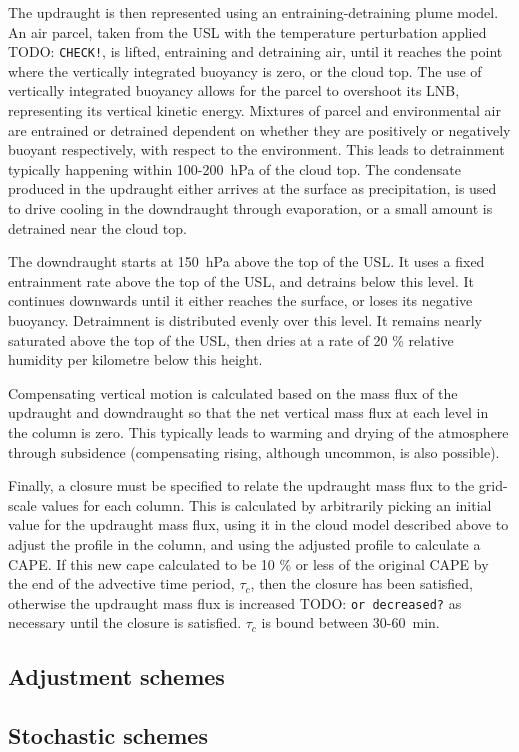 \documentclass[11pt,a4paper]{article}
\newcommand{\todo}{TODO: \texttt}
\begin{document}
The updraught is then represented using an entraining-detraining plume model. An air parcel, taken from the USL with the temperature perturbation applied \todo{CHECK!}, is lifted, entraining and detraining air, until it reaches the point where the vertically integrated buoyancy is zero, or the cloud top. The use of vertically integrated buoyancy allows for the parcel to overshoot its LNB, representing its vertical kinetic energy. Mixtures of parcel and environmental air are entrained or detrained dependent on whether they are positively or negatively buoyant respectively, with respect to the environment. This leads to detrainment typically happening within \SI{100}{}-\SI{200}{hPa} of the cloud top. The condensate produced in the updraught either arrives at the surface as precipitation, is used to drive cooling in the downdraught through evaporation, or a small amount is detrained near the cloud top.

The downdraught starts at \SI{150}{hPa} above the top of the USL. It uses a fixed entrainment rate above the top of the USL, and detrains below this level. It continues downwards until it either reaches the surface, or loses its negative buoyancy. Detraimnent is distributed evenly over this level. It remains nearly saturated above the top of the USL, then dries at a rate of 20 \% relative humidity per kilometre below this height.

Compensating vertical motion is calculated based on the mass flux of the updraught and downdraught so that the net vertical mass flux at each level in the column is zero. This typically leads to warming and drying of the atmosphere through subsidence (compensating rising, although uncommon, is also possible).

Finally, a closure must be specified to relate the updraught mass flux to the grid-scale values for each column. This is calculated by arbitrarily picking an initial value for the updraught mass flux, using it in the cloud model described above to adjust the profile in the column, and using the adjusted profile to calculate a CAPE. If this new cape calculated to be 10 \% or less of the original CAPE by the end of the advective time period, $\tau_c$, then the closure has been satisfied, otherwise the updraught mass flux is increased \todo{or decreased?} as necessary until the closure is satisfied. $\tau_c$ is bound between \SI{30}{}-\SI{60}{min}.

\subsection{Adjustment schemes}

\cite{manabe1965simulated}

\cite{betts1986new}

\cite{betts1986new2}

\subsection{Stochastic schemes}
\label{sec:stochastic_schemes}

\cite{plant2008stochastic}

\cite{sakradzija2016stochastic}

\newpage
\printbibliography[title={References}]

\end{document}
